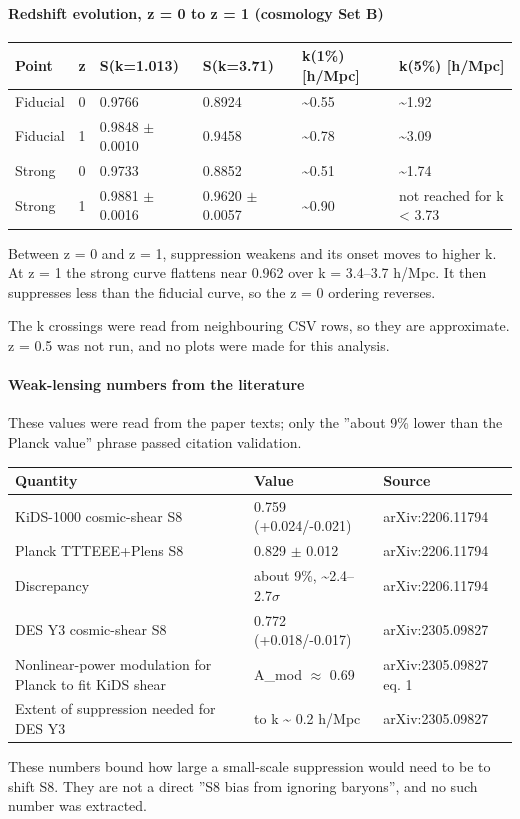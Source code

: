 \documentclass[11pt,a4paper]{article}
\begin{document}
\paragraph{Redshift evolution, z = 0 to z = 1 (cosmology Set B)}
\begin{longtable}{@{}p{}p{}p{}p{}p{}p{}@{}}
\toprule
\textbf{Point} & \textbf{z} & \textbf{S(k=1.013)} & \textbf{S(k=3.71)} & \textbf{k(1\%) [h/Mpc]} & \textbf{k(5\%) [h/Mpc]} \\ \midrule \endhead
Fiducial & 0 & 0.9766 & 0.8924 & \textasciitilde{}0.55 & \textasciitilde{}1.92 \\
Fiducial & 1 & 0.9848 $\pm$ 0.0010 & 0.9458 & \textasciitilde{}0.78 & \textasciitilde{}3.09 \\
Strong & 0 & 0.9733 & 0.8852 & \textasciitilde{}0.51 & \textasciitilde{}1.74 \\
Strong & 1 & 0.9881 $\pm$ 0.0016 & 0.9620 $\pm$ 0.0057 & \textasciitilde{}0.90 & not reached for k \textless{} 3.73 \\
\bottomrule\end{longtable}
Between z = 0 and z = 1, suppression weakens and its onset moves to higher k. At z = 1 the strong curve flattens near 0.962 over k = 3.4--3.7 h/Mpc. It then suppresses less than the fiducial curve, so the z = 0 ordering reverses.

The k crossings were read from neighbouring CSV rows, so they are approximate. z = 0.5 was not run, and no plots were made for this analysis.

\paragraph{Weak-lensing numbers from the literature}
These values were read from the paper texts; only the ''about 9\% lower than the Planck value'' phrase passed citation validation.

\begin{longtable}{@{}p{}p{}p{}@{}}
\toprule
\textbf{Quantity} & \textbf{Value} & \textbf{Source} \\ \midrule \endhead
KiDS-1000 cosmic-shear S8 & 0.759 (+0.024/-0.021) & arXiv:2206.11794 \\
Planck TTTEEE+Plens S8 & 0.829 $\pm$ 0.012 & arXiv:2206.11794 \\
Discrepancy & about 9\%, \textasciitilde{}2.4--2.7$\sigma$ & arXiv:2206.11794 \\
DES Y3 cosmic-shear S8 & 0.772 (+0.018/-0.017) & arXiv:2305.09827 \\
Nonlinear-power modulation for Planck to fit KiDS shear & A\_mod $\approx$ 0.69 & arXiv:2305.09827 eq. 1 \\
Extent of suppression needed for DES Y3 & to k \textasciitilde{} 0.2 h/Mpc & arXiv:2305.09827 \\
\bottomrule\end{longtable}
These numbers bound how large a small-scale suppression would need to be to shift S8. They are not a direct ''S8 bias from ignoring baryons'', and no such number was extracted.
\end{document}
